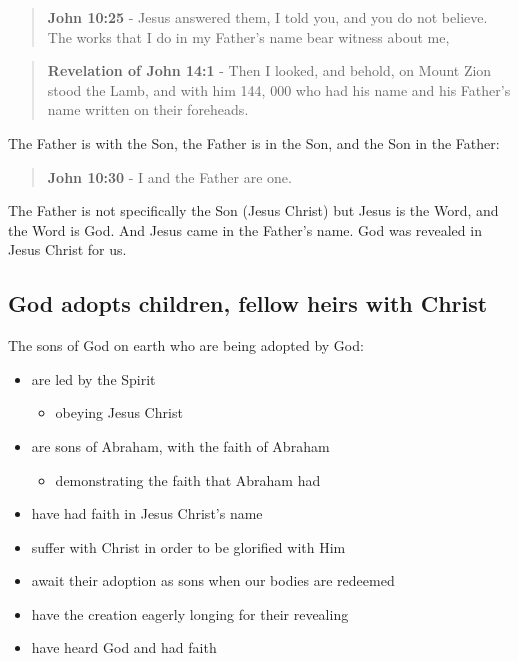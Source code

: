 \documentclass[11pt]{article}
\begin{document}
\begin{quote}
\textbf{John 10:25} - Jesus answered them, I told you, and you do not believe. The works that I do in my Father's name bear witness about me,
\end{quote}

\begin{quote}
\textbf{Revelation of John 14:1} - Then I looked, and behold, on Mount Zion stood the Lamb, and with him 144, 000 who had his name and his Father's name written on their foreheads.
\end{quote}

The Father is with the Son, the Father is in the Son, and the Son in the Father:

\begin{quote}
\textbf{John 10:30} - I and the Father are one.
\end{quote}

The Father is not specifically the Son (Jesus Christ) but Jesus is the Word, and the Word is God.
And Jesus came in the Father's name. God was revealed in Jesus Christ for us.

\subsection{God adopts children, fellow heirs with Christ}
\label{sec:orgb645895}
The sons of God on earth who are being adopted by God:
\begin{itemize}
\item are led by the Spirit
\begin{itemize}
\item obeying Jesus Christ
\end{itemize}
\item are sons of Abraham, with the faith of Abraham
\begin{itemize}
\item demonstrating the faith that Abraham had
\end{itemize}
\item have had faith in Jesus Christ's name
\item suffer with Christ in order to be glorified with Him
\item await their adoption as sons when our bodies are redeemed
\item have the creation eagerly longing for their revealing
\item have heard God and had faith
\end{itemize}
\end{document}
